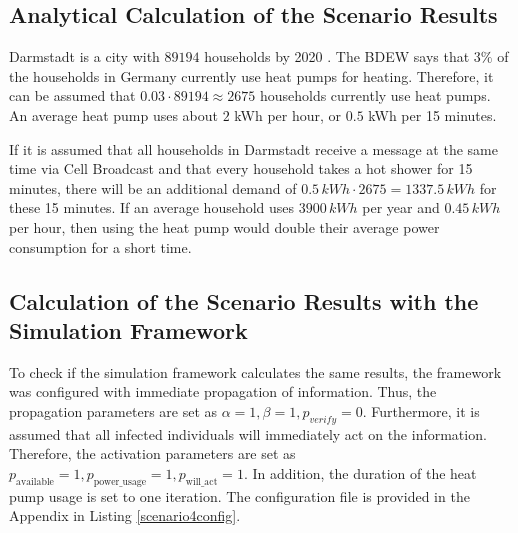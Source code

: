 \subsection{Analytical Calculation of the Scenario Results}

Darmstadt is a city with $89194$ households by 2020 
\cite{statistadarmstadt}. The BDEW
says that $3\%$ of the households in Germany currently use
heat pumps for heating. Therefore, it can be assumed that 
$0.03 \cdot 89194 \approx 2675$ households currently use 
heat pumps. An average heat pump uses about $2$ kWh per hour, 
or $0.5$ kWh per 15 minutes.

If it is assumed that all households in Darmstadt receive 
a message at the same time via Cell Broadcast and that
every household takes a hot shower for 15 minutes,
there will be an additional 
demand of $0.5\,kWh \cdot 2675 = 1337.5\,kWh $ for these 
15 minutes. If an average household uses $3900\,kWh$ 
per year and $0.45\,kWh$ per hour, then using the heat pump 
would double their average power consumption for a short time.

\subsection{Calculation of the Scenario Results with the Simulation Framework}
To check if the simulation framework calculates the same 
results, the framework was configured with immediate
propagation of information. Thus, the propagation
parameters are set as 
$\alpha=1, \beta=1, p_{verify}=0$. 
Furthermore, it is assumed that all infected 
individuals will immediately act on the information.
Therefore, the activation parameters are 
set as $p_{\mathrm{available}}=1, 
p_{\mathrm{power\_usage}}=1, p_{\mathrm{will\_act}}=1$.
In addition, the duration of the heat pump usage is set to one iteration.
The configuration file is provided in the Appendix in
Listing \ref{scenario4config}.

